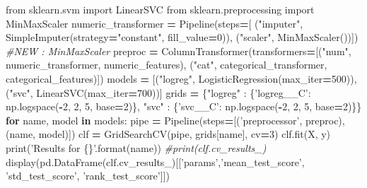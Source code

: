 \documentclass[10pt,a4paper]{article}
\newenvironment{Shaded}{\begin{snugshade}}{\end{snugshade}}
\newcommand{\BuiltInTok}[1]{#1}
\newcommand{\CommentTok}[1]{\textcolor[rgb]{0.56,0.35,0.01}{\textit{#1}}}
\newcommand{\ControlFlowTok}[1]{\textcolor[rgb]{0.13,0.29,0.53}{\textbf{#1}}}
\newcommand{\DecValTok}[1]{\textcolor[rgb]{0.00,0.00,0.81}{#1}}
\newcommand{\ImportTok}[1]{#1}
\newcommand{\KeywordTok}[1]{\textcolor[rgb]{0.13,0.29,0.53}{\textbf{#1}}}
\newcommand{\NormalTok}[1]{#1}
\newcommand{\OperatorTok}[1]{\textcolor[rgb]{0.81,0.36,0.00}{\textbf{#1}}}
\newcommand{\SpecialCharTok}[1]{\textcolor[rgb]{0.00,0.00,0.00}{#1}}
\newcommand{\StringTok}[1]{\textcolor[rgb]{0.31,0.60,0.02}{#1}}
\theoremstyle{break}
\begin{document}
\begin{Shaded}
\begin{Highlighting}[]
\ImportTok{from}\NormalTok{ sklearn.svm }\ImportTok{import}\NormalTok{ LinearSVC}
\ImportTok{from}\NormalTok{ sklearn.preprocessing }\ImportTok{import}\NormalTok{ MinMaxScaler}
\NormalTok{numeric_transformer }\OperatorTok{=}\NormalTok{ Pipeline(steps}\OperatorTok{=}\NormalTok{[}
\NormalTok{                                    (}\StringTok{"imputer"}\NormalTok{, SimpleImputer(strategy}\OperatorTok{=}\StringTok{"constant"}\NormalTok{, fill_value}\OperatorTok{=}\DecValTok{0}\NormalTok{)),}
\NormalTok{                                    (}\StringTok{"scaler"}\NormalTok{, MinMaxScaler())]) }\CommentTok{#NEW : MinMaxScaler}
\NormalTok{preproc }\OperatorTok{=}\NormalTok{ ColumnTransformer(transformers}\OperatorTok{=}\NormalTok{[(}\StringTok{"num"}\NormalTok{, numeric_transformer, numeric_features),}
\NormalTok{                                          (}\StringTok{"cat"}\NormalTok{, categorical_transformer, categorical_features)])}
\NormalTok{models }\OperatorTok{=}\NormalTok{ [(}\StringTok{"logreg"}\NormalTok{, LogisticRegression(max_iter}\OperatorTok{=}\DecValTok{500}\NormalTok{)),}
\NormalTok{          (}\StringTok{"svc"}\NormalTok{, LinearSVC(max_iter}\OperatorTok{=}\DecValTok{700}\NormalTok{))]}
\NormalTok{grids }\OperatorTok{=}\NormalTok{ \{}\StringTok{"logreg"}\NormalTok{ : \{}\StringTok{'logreg__C'}\NormalTok{: np.logspace(}\OperatorTok{-}\DecValTok{2}\NormalTok{, }\DecValTok{2}\NormalTok{, }\DecValTok{5}\NormalTok{, base}\OperatorTok{=}\DecValTok{2}\NormalTok{)\},}
         \StringTok{"svc"}\NormalTok{ : \{}\StringTok{'svc__C'}\NormalTok{: np.logspace(}\OperatorTok{-}\DecValTok{2}\NormalTok{, }\DecValTok{2}\NormalTok{, }\DecValTok{5}\NormalTok{, base}\OperatorTok{=}\DecValTok{2}\NormalTok{)\}\}}
\ControlFlowTok{for}\NormalTok{ name, model }\KeywordTok{in}\NormalTok{ models:}
\NormalTok{    pipe }\OperatorTok{=}\NormalTok{ Pipeline(steps}\OperatorTok{=}\NormalTok{[(}\StringTok{'preprocessor'}\NormalTok{, preproc), (name, model)])}
\NormalTok{    clf }\OperatorTok{=}\NormalTok{ GridSearchCV(pipe, grids[name], cv}\OperatorTok{=}\DecValTok{3}\NormalTok{)}
\NormalTok{    clf.fit(X, y)}
    \BuiltInTok{print}\NormalTok{(}\StringTok{'Results for }\SpecialCharTok{\{\}}\StringTok{'}\NormalTok{.}\BuiltInTok{format}\NormalTok{(name))}
    \CommentTok{#print(clf.cv_results_)}
\NormalTok{    display(pd.DataFrame(clf.cv_results_)[[}\StringTok{'params'}\NormalTok{,}\StringTok{'mean_test_score'}\NormalTok{, }\StringTok{'std_test_score'}\NormalTok{,}
                                           \StringTok{'rank_test_score'}\NormalTok{]])}
\end{Highlighting}
\end{Shaded}
\end{document}
